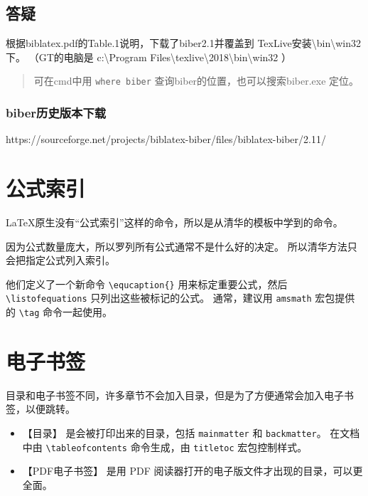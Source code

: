 \documentclass[../Main/thesis.tex]{subfiles}
\begin{document}
\subsection{答疑}

根据biblatex.pdf的Table.1说明，下载了biber2.1并覆盖到
TexLive安装\textbackslash bin\textbackslash win32下。
（GT的电脑是 c:\textbackslash Program Files\textbackslash texlive\textbackslash 2018\textbackslash bin\textbackslash win32 ）

\begin{quote}
可在cmd中用 \texttt{where\ biber} 查询biber的位置，也可以搜索biber.exe
定位。
\end{quote}

\subsubsection{biber历史版本下载}

https://sourceforge.net/projects/biblatex-biber/files/biblatex-biber/2.11/

\section{公式索引}

\LaTeX 原生没有``公式索引''这样的命令，所以是从清华的模板中学到的命令。

因为公式数量庞大，所以罗列所有公式通常不是什么好的决定。
所以清华方法只会把指定公式列入索引。

他们定义了一个新命令 \texttt{\textbackslash{}equcaption\{\}}
用来标定重要公式，然后 \texttt{\textbackslash{}listofequations}
只列出这些被标记的公式。 通常，建议用 \texttt{amsmath} 宏包提供的
\texttt{\textbackslash{}tag} 命令一起使用。

\section{电子书签}

目录和电子书签不同，许多章节不会加入目录，但是为了方便通常会加入电子书签，以便跳转。

\begin{itemize}
\item
  【目录】 是会被打印出来的目录，包括 \texttt{mainmatter} 和
  \texttt{backmatter}。 在文档中由
  \texttt{\textbackslash{}tableofcontents} 命令生成，由
  \texttt{titletoc} 宏包控制样式。
\item
  【PDF电子书签】 是用 PDF
  阅读器打开的电子版文件才出现的目录，可以更全面。
\end{itemize}
\end{document}
